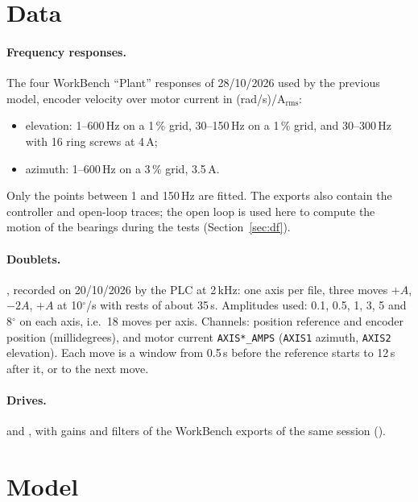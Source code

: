 \documentclass[10pt,a4paper]{article}
\numberwithin{equation}{section}
\begin{document}
\tableofcontents

\section{Data}\label{sec:data}
\paragraph{Frequency responses.} The four WorkBench ``Plant'' responses of 28/10/2026 used by the previous model, encoder velocity over motor current in (rad/s)/A$_\mathrm{rms}$:
\begin{itemize}
\item elevation: 1--600\,Hz on a 1\,\% grid, 30--150\,Hz on a 1\,\% grid, and 30--300\,Hz with 16 ring screws at 4\,A;
\item azimuth: 1--600\,Hz on a 3\,\% grid, 3.5\,A.
\end{itemize}
Only the points between 1 and 150\,Hz are fitted. The exports also contain the controller and open-loop traces; the open loop is used here to compute the motion of the bearings during the tests (Section~\ref{sec:df}).

\paragraph{Doublets.} , recorded on 20/10/2026 by the PLC at 2\,kHz: one axis per file, three moves $+A$, $-2A$, $+A$ at 10$^\circ$/s with rests of about 35\,s. Amplitudes used: 0.1, 0.5, 1, 3, 5 and 8$^\circ$ on each axis, i.e.\ 18 moves per axis. Channels: position reference and encoder position (millidegrees), and motor current \texttt{AXIS*\_AMPS} (\texttt{AXIS1} azimuth, \texttt{AXIS2} elevation). Each move is a window from 0.5\,s before the reference starts to 12\,s after it, or to the next move.

\paragraph{Drives.}  and , with gains and filters of the WorkBench exports of the same session ().

\section{Model}\label{sec:model}
\end{document}
